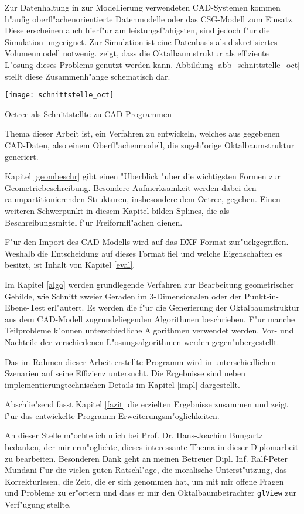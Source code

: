 Zur Datenhaltung in zur Modellierung verwendeten CAD-Systemen kommen h"aufig
oberfl"achenorientierte Datenmodelle oder das CSG-Modell zum Einsatz. 
Diese erscheinen auch hierf"ur am leistungsf"ahigsten, sind jedoch f"ur die
Simulation ungeeignet. Zur Simulation ist eine Datenbasis als diskretisiertes 
Volumenmodell notwenig. \cite{diss_oct} zeigt, dass die Oktalbaumstruktur 
als effiziente L"osung dieses Problems genutzt werden kann.
Abbildung \ref{abb_schnittstelle_oct} stellt diese Zusammenh"ange schematisch 
dar.

\diabeg
\texttt{[image: schnittstelle\_oct]}
\caption{Octree als Schnittstellte zu CAD-Programmen}
\label{abb_schnittstelle_oct}
\diaend

Thema dieser Arbeit ist, ein Verfahren zu entwickeln, welches aus gegebenen
CAD-Daten, also einem Oberfl"achenmodell, die zugeh"orige Oktalbaumstruktur
generiert.

Kapitel \ref{geombeschr} gibt einen "Uberblick "uber die
wichtigsten Formen zur Geometriebeschreibung. Besondere Aufmerksamkeit
werden dabei den raumpartitionierenden Strukturen, insbesondere dem Octree, 
gegeben. Einen weiteren Schwerpunkt in diesem Kapitel bilden Splines, die 
als Beschreibungsmittel f"ur Freiformfl"achen dienen.

F"ur den Import des CAD-Modells wird auf das DXF-Format zur"uckgegriffen. 
Weshalb die Entscheidung auf dieses Format fiel und welche Eigenschaften es 
besitzt, ist Inhalt von Kapitel \ref{eval}. 

Im Kapitel \ref{algo} werden grundlegende Verfahren zur Bearbeitung 
geometrischer Gebilde, wie Schnitt zweier Geraden im 3-Dimensionalen oder 
der Punkt-in-Ebene-Test erl"autert. Es werden die f"ur die Generierung 
der Oktalbaumstruktur aus dem CAD-Modell zugrundeliegenden Algorithmen 
beschrieben. 
F"ur manche Teilprobleme k"onnen unterschiedliche Algorithmen verwendet 
werden. Vor- und Nachteile der verschiedenen L"osungsalgorithmen werden 
gegen"ubergestellt.

Das im Rahmen dieser Arbeit erstellte Programm wird in unterschiedlichen 
Szenarien auf seine Effizienz untersucht. Die Ergebnisse sind neben 
implementierungtechnischen Details im Kapitel \ref{impl} dargestellt.

Abschlie"send fasst Kapitel \ref{fazit} die erzielten Ergebnisse zusammen
und zeigt f"ur das entwickelte Programm Erweiterungsm"oglichkeiten.

An dieser Stelle m"ochte ich mich bei Prof. Dr. Hans-Joachim Bungartz 
bedanken, der mir erm"oglichte, dieses interessante Thema in dieser 
Diplomarbeit zu bearbeiten.
Besonderen Dank geht an meinen Betreuer Dipl. Inf. Ralf-Peter Mundani f"ur 
die vielen guten Ratschl"age, die moralische Unterst"utzung, das 
Korrekturlesen, die Zeit, die er sich genommen hat, um mit mir offene 
Fragen und Probleme zu er"ortern und dass er mir den Oktalbaumbetrachter 
\texttt{glView} zur Verf"ugung stellte. 

